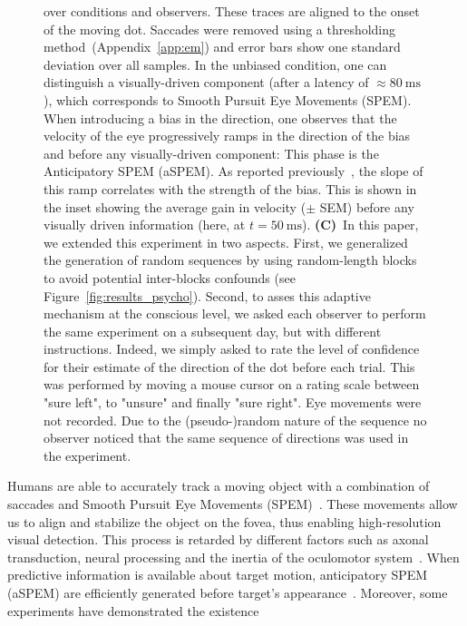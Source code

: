 \documentclass[profile,final,english, draft]{article}%
\newcommand{\ms}{\si{\milli\second}}%
\newcommand{\citep}[1]{\parencite{#1}}
\newcommand{\seeFig}[1]{Figure~\ref{fig:#1}}
\newcommand{\seeApp}[1]{Appendix~\ref{app:#1}}
\begin{document}
\begin{figure}
{over conditions and observers.
These traces are aligned to the onset of the moving dot.
Saccades were removed using a thresholding method~(\seeApp{em}) and
error bars show one standard deviation over all samples.
In the unbiased condition, one can distinguish
a visually-driven component (after a latency of $\approx 80~\ms$),
which corresponds to Smooth Pursuit Eye Movements (SPEM).
When introducing a bias in the direction,
one observes that the velocity of the eye progressively ramps
in the direction of the bias and before any visually-driven component:
This phase is the Anticipatory SPEM (aSPEM).
As reported previously~\citep{Montagnini2010, SantosKowler2017},
the slope of this ramp correlates with the strength of the bias.
This is shown in the inset showing the average gain in velocity ($\pm$ SEM)
before any visually driven information (here, at $t=50~\ms$).
\textbf{(C)}~In this paper, we extended this experiment in two aspects.
First, we generalized the generation of random sequences
by using random-length blocks
to avoid potential inter-blocks confounds (see \seeFig{results_psycho}).
Second, to asses this adaptive mechanism at the conscious level,
we asked each observer to perform the same experiment on a subsequent day,
but with different instructions.
Indeed, we simply asked to rate the level of confidence
for their estimate of the direction of the dot before each trial.
This was performed by moving a mouse cursor on a rating scale
between "sure left", to "unsure" and finally "sure right".
Eye movements were not recorded.
Due to the (pseudo-)random nature of the sequence no observer noticed
that the same sequence of directions was used in the experiment.
}
\label{fig:intro}
\end{figure}
Humans are able to accurately track a moving object
with a combination of saccades and
Smooth Pursuit Eye Movements (SPEM)~\citep{ref}.
These movements allow us to align and
stabilize the object on the fovea,
thus enabling high-resolution visual detection.
This process is retarded by different factors such as axonal transduction,
neural processing and the inertia of the oculomotor system~\citep{Krauzlis}.
When predictive information is available about target motion,
anticipatory SPEM (aSPEM) are
efficiently generated before target's appearance~\citep{Westheimer1954, Kowler1979a, Kowler1979b}.
Moreover, some experiments have demonstrated the existence
\end{document}
